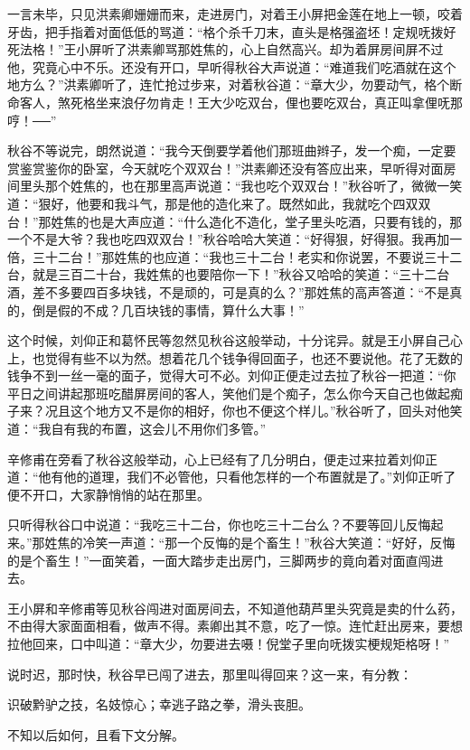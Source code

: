 \documentclass[12pt,UTF8]{ctexbook}
\begin{document}
{{{一言未毕，只见洪素卿姗姗而来，走进房门，对着王小屏把金莲在地上一顿，咬着牙齿，把手指着对面低低的骂道：“格个杀千刀末，直头是格强盗坯！定规呒拨好死法格！”王小屏听了洪素卿骂那姓焦的，心上自然高兴。却为着屏房间屏不过他，究竟心中不乐。还没有开口，早听得秋谷大声说道：“难道我们吃酒就在这个地方么？”洪素卿听了，连忙抢过步来，对着秋谷道：“章大少，勿要动气，格个断命客人，煞死格坐来浪仔勿肯走！王大少吃双台，俚也要吃双台，真正叫拿俚呒那哼！──”

秋谷不等说完，朗然说道：“我今天倒要学着他们那班曲辫子，发一个痴，一定要赏鉴赏鉴你的卧室，今天就吃个双双台！”洪素卿还没有答应出来，早听得对面房间里头那个姓焦的，也在那里高声说道：“我也吃个双双台！”秋谷听了，微微一笑道：“狠好，他要和我斗气，那是他的造化来了。既然如此，我就吃个四双双台！”那姓焦的也是大声应道：“什么造化不造化，堂子里头吃酒，只要有钱的，那一个不是大爷？我也吃四双双台！”秋谷哈哈大笑道：“好得狠，好得狠。我再加一倍，三十二台！”那姓焦的也应道：“我也三十二台！老实和你说罢，不要说三十二台，就是三百二十台，我姓焦的也要陪你一下！”秋谷又哈哈的笑道：“三十二台酒，差不多要四百多块钱，不是顽的，可是真的么？”那姓焦的高声答道：“不是真的，倒是假的不成？几百块钱的事情，算什么大事！”

这个时候，刘仰正和葛怀民等忽然见秋谷这般举动，十分诧异。就是王小屏自己心上，也觉得有些不以为然。想着花几个钱争得回面子，也还不要说他。花了无数的钱争不到一丝一毫的面子，觉得大可不必。刘仰正便走过去拉了秋谷一把道：“你平日之间讲起那班吃醋屏房间的客人，笑他们是个痴子，怎么你今天自己也做起痴子来？况且这个地方又不是你的相好，你也不便这个样儿。”秋谷听了，回头对他笑道：“我自有我的布置，这会儿不用你们多管。”

辛修甫在旁看了秋谷这般举动，心上已经有了几分明白，便走过来拉着刘仰正道：“他有他的道理，我们不必管他，只看他怎样的一个布置就是了。”刘仰正听了便不开口，大家静悄悄的站在那里。

只听得秋谷口中说道：“我吃三十二台，你也吃三十二台么？不要等回儿反悔起来。”那姓焦的冷笑一声道：“那一个反悔的是个畜生！”秋谷大笑道：“好好，反悔的是个畜生！”一面笑着，一面大踏步走出房门，三脚两步的竟向着对面直闯进去。

王小屏和辛修甫等见秋谷闯进对面房间去，不知道他葫芦里头究竟是卖的什么药，不由得大家面面相看，做声不得。素卿出其不意，吃了一惊。连忙赶出房来，要想拉他回来，口中叫道：“章大少，勿要进去嗫！倪堂子里向呒拨实梗规矩格呀！”

说时迟，那时快，秋谷早已闯了进去，那里叫得回来？这一来，有分教：

识破黔驴之技，名妓惊心；幸逃子路之拳，滑头丧胆。

不知以后如何，且看下文分解。





}}}
\end{document}
